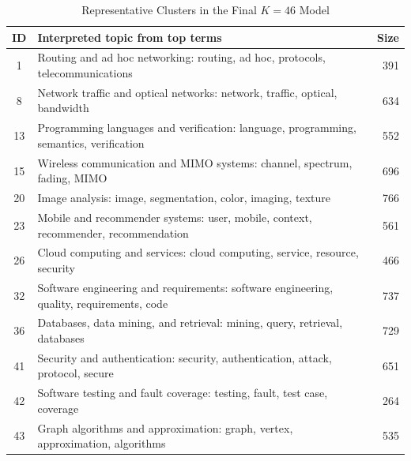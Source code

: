 \documentclass[conference]{IEEEtran}
\begin{document}
\begin{table}[!t]
\caption{Representative Clusters in the Final $K=46$ Model}
\label{tab:clusters}
\centering
\footnotesize
\begin{tabular}{c >{\raggedright\arraybackslash}p{} r}
\toprule
ID & Interpreted topic from top terms & Size \\
\midrule
1 & Routing and ad hoc networking: routing, ad hoc, protocols, telecommunications & 391 \\
8 & Network traffic and optical networks: network, traffic, optical, bandwidth & 634 \\
13 & Programming languages and verification: language, programming, semantics, verification & 552 \\
15 & Wireless communication and MIMO systems: channel, spectrum, fading, MIMO & 696 \\
20 & Image analysis: image, segmentation, color, imaging, texture & 766 \\
23 & Mobile and recommender systems: user, mobile, context, recommender, recommendation & 561 \\
26 & Cloud computing and services: cloud computing, service, resource, security & 466 \\
32 & Software engineering and requirements: software engineering, quality, requirements, code & 737 \\
36 & Databases, data mining, and retrieval: mining, query, retrieval, databases & 729 \\
41 & Security and authentication: security, authentication, attack, protocol, secure & 651 \\
42 & Software testing and fault coverage: testing, fault, test case, coverage & 264 \\
43 & Graph algorithms and approximation: graph, vertex, approximation, algorithms & 535 \\
\bottomrule
\end{tabular}
\end{table}
\end{document}
